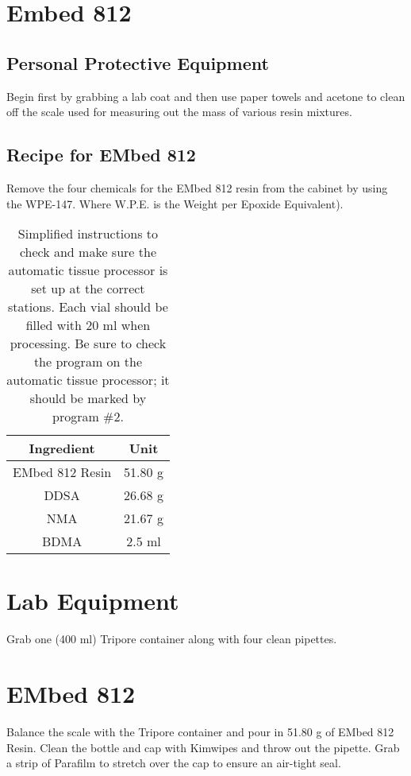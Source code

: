 \section{Embed 812}
\subsection{Personal Protective Equipment}\label{PPE}
Begin first by grabbing a lab coat and then use paper towels and acetone to
clean off the scale used for measuring out the mass of various resin mixtures.

\subsection{Recipe for EMbed 812}\label{EMbed_812}
Remove the four chemicals for the EMbed 812 resin from the cabinet by using the
WPE-147.  Where W.P.E. is the Weight per Epoxide Equivalent).

\begin{table}[h!]
	\centering
	\begin{tabular}{|c|c|}
		\hline
		{\bf Ingredient} & {\bf Unit}\\ \hline\hline
		EMbed 812 Resin & 51.80 g\\ \hline
		DDSA & 26.68 g\\ \hline
		NMA & 21.67 g\\ \hline
		BDMA & 2.5 ml\\ \hline
	\end{tabular}
    \caption{Simplified instructions to check and make sure the automatic
    tissue processor is set up at the correct stations.  Each vial should be
    filled with 20 ml when processing.  Be sure to check the program on the
    automatic tissue processor; it should be marked by program \#2.}
\end{table}

\section{Lab Equipment}\label{lab_equipment}
Grab one (400 ml) Tripore container along with four clean pipettes.

\section{EMbed 812}\label{EMbed_812_Resin}
Balance the scale with the Tripore container and pour in 51.80 g of EMbed 812
Resin.  Clean the bottle and cap with Kimwipes and throw out the pipette.  Grab
a strip of Parafilm to stretch over the cap to ensure an air-tight seal. 

